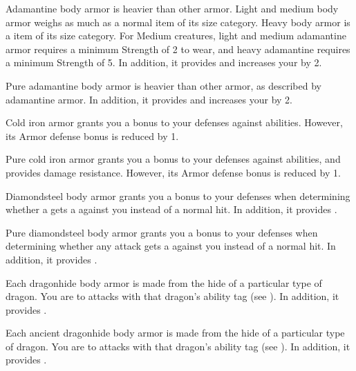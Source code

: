        Adamantine body armor is heavier than other armor.
      Light and medium body armor weighs as much as a normal item of its size category.
      Heavy body armor is a  item of its size category.
      For Medium creatures, light and medium adamantine armor requires a minimum Strength of 2 to wear, and heavy adamantine requires a minimum Strength of 5.
      In addition, it provides   and increases your  by 2.

       Pure adamantine body armor is heavier than other armor, as described by adamantine armor.
      In addition, it provides   and increases your  by 2.

       Cold iron armor grants you a  bonus to your defenses against \magical abilities.
      However, its Armor defense bonus is reduced by 1.

       Pure cold iron armor grants you a  bonus to your defenses against \magical abilities, and provides  damage resistance.
      However, its Armor defense bonus is reduced by 1.

       Diamondsteel body armor grants you a  bonus to your defenses when determining whether a  gets a  against you instead of a normal hit.
      In addition, it provides  .

       Pure diamondsteel body armor grants you a  bonus to your defenses when determining whether any attack gets a  against you instead of a normal hit.
      In addition, it provides  .

       Each dragonhide body armor is made from the hide of a particular type of dragon.
      You are  to attacks with that dragon's ability tag (see ).
      In addition, it provides  .

       Each ancient dragonhide body armor is made from the hide of a particular type of dragon.
      You are  to attacks with that dragon's ability tag (see ).
      In addition, it provides  .

